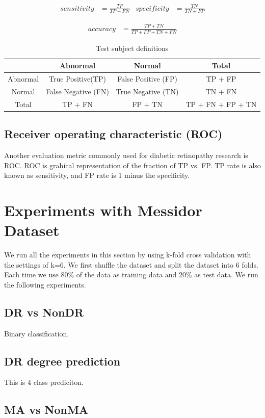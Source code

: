 \begin{align*}
    sensitivity &= \frac{TP}{TP + FN}
    &
    specificity &= \frac{TN}{TN + FP}
\end{align*}

\begin{align*}
    accuracy &= \frac{TP + TN}{TP + FP + TN + FN}
\end{align*}

\begin{table}[t]
\centering
\caption{Test subject definitions} 
\label{tab:configs}
\begin{tabular}{|c|c|c|c|} \hline
     & Abnormal & Normal & Total  \\ \hline
     Abnormal& True Positive(TP) & False Positive (FP) & TP + FP \\ \hline
     Normal & False Negative (FN) & True Negative (TN) & TN + FN \\ \hline
     Total & TP + FN &  FP + TN & TP + FN + FP + TN \\ \hline
\end{tabular}
\end{table}

\subsection{Receiver operating characteristic (ROC)}
Another evaluation metric commonly used for diabetic retinopathy research is ROC. ROC is grahical representation of the fraction of TP  vs. FP. TP rate is also known as sensitivity, and FP rate is 1 minus the specificity. 


\section{Experiments with Messidor Dataset}
We run all the experiments in this section by using k-fold cross validation with the settings of k=6. We first shuffle the dataset and split the dataset into 6 folds. Each time we use 80\% of the data as training data and 20\% as test data. We run the following experiments.
\subsection{DR vs NonDR}
Binary classification.
\subsection{DR degree prediction}
This is 4 class prediciton.
\subsection{MA vs NonMA}
